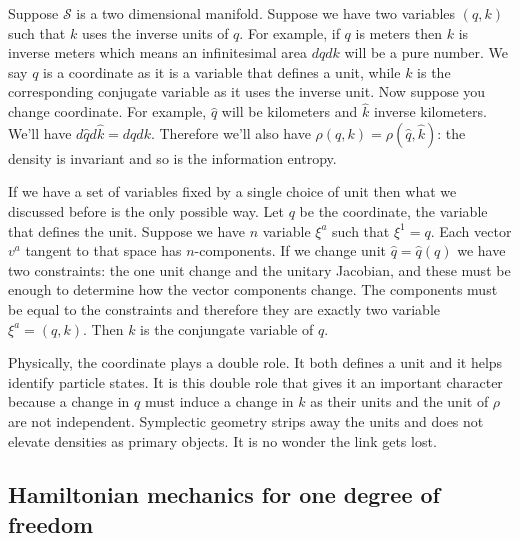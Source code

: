 \documentclass[11pt]{article}
\begin{document}
Suppose $\mathcal{S}$ is a two dimensional manifold. Suppose we have two variables $(q,k)$ such that $k$ uses the inverse units of $q$. For example, if $q$ is meters then $k$ is inverse meters which means an infinitesimal area $dq dk$ will be a pure number. We say $q$ is a coordinate as it is a variable that defines a unit, while $k$ is the corresponding conjugate variable as it uses the inverse unit. Now suppose you change coordinate. For example, $\hat{q}$ will be kilometers and $\hat{k}$ inverse kilometers. We'll have $d\hat{q} d\hat{k} = dq dk$. Therefore we'll also have $\rho(q,k) = \rho(\hat{q}, \hat{k})$: the density is invariant and so is the information entropy.

If we have a set of variables fixed by a single choice of unit then what we discussed before is the only possible way. Let $q$ be the coordinate, the variable that defines the unit. Suppose we have $n$ variable $\xi^a$ such that $\xi^1 = q$. Each vector $v^a$ tangent to that space has $n$-components. If we change unit $\hat{q}=\hat{q}(q)$ we have two constraints: the one unit change and the unitary Jacobian, and these must be enough to determine how the vector components change. The components must be equal to the constraints and therefore they are exactly two variable $\xi^a = (q, k)$. Then $k$ is the conjungate variable of $q$.

Physically, the coordinate plays a double role. It both defines a unit and it helps identify particle states. It is this double role that gives it an important character because a change in $q$ must induce a change in $k$ as their units and the unit of $\rho$ are not independent. Symplectic geometry strips away the units and does not elevate densities as primary objects. It is no wonder the link gets lost.

\subsection*{Hamiltonian mechanics for one degree of freedom}
\end{document}
